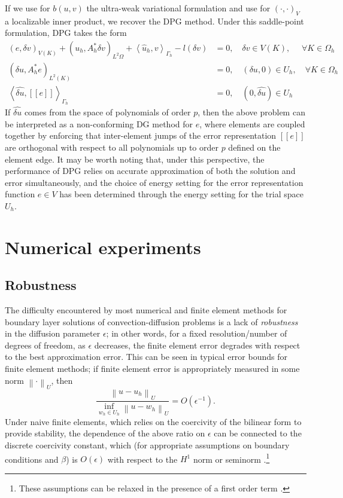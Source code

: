 \documentclass[11pt,onecolumn]{scrartcl}
\newcommand{\nor}[1]{\left\| #1 \right\|}
\newcommand{\LRp}[1]{\left( #1 \right)}
\newcommand{\LRs}[1]{\left[ #1 \right]}
\newcommand{\LRa}[1]{\left\langle #1 \right\rangle}
\newcommand{\jump}[1] {\ensuremath{\LRs{\!\left[#1\right]\!}}}
\newcommand{\uh}{\widehat{u}}
\newcommand{\Gh}{\Gamma_h}
\newcommand{\Oh}{\Omega_h}
\begin{document}
If we use for $b(u,v)$ the ultra-weak variational formulation and use for $\LRp{\cdot,\cdot}_V$ a localizable inner product, we recover the DPG method.  Under this saddle-point formulation, DPG takes the form
\begin{align*}
\LRp{e,\delta v}_{V(K)} + \LRp{u_h,A^*_h\delta v}_{L^2{\Omega}} + \LRa{\uh_h,v}_{\Gh}- l(\delta v) &= 0, \quad \delta v \in V(K),\,\, \quad \forall K\in \Oh\\
\LRp{\delta u, A_h^*e}_{L^2(K)} &= 0, \quad \LRp{\delta u,0} \in U_h, \quad \forall K\in \Oh\\
\LRa{\widehat{\delta u}, \jump{e}}_{\Gh} &= 0, \quad \LRp{0,\widehat{\delta u}} \in U_h
\end{align*}
If $\widehat{\delta u}$ comes from the space of polynomials of order $p$, then the above problem can be interpreted as a non-conforming DG method for $e$, where elements are coupled together by enforcing that inter-element jumps of the error representation $\jump{e}$ are orthogonal with respect to all polynomials up to order $p$ defined on the element edge.  It may be worth noting that, under this perspective, the performance of DPG relies on accurate approximation of both the solution and error simultaneously, and the choice of energy setting for the error representation function $e \in V$ has been determined through the energy setting for the trial space $U_h$.  

\section{Numerical experiments}

\subsection{Robustness}
The difficulty encountered by most numerical and finite element methods for boundary layer solutions of convection-diffusion problems is a lack of \textit{robustness} in the diffusion parameter $\epsilon$; in other words, for a fixed resolution/number of degrees of freedom, as $\epsilon$ decreases, the finite element error degrades with respect to the best approximation error.  This can be seen in typical error bounds for finite element methods; if finite element error is appropriately measured in some norm $\nor{\cdot}_U$, then
\[
\frac{\nor{u-u_h}_U}{\inf_{w_h\in U_h}\nor{u-w_h}_U} = O(\epsilon^{-1}).
\]
Under naive finite elements, which relies on the coercivity of the bilinear form to provide stability, the dependence of the above ratio on $\epsilon$ can be connected to the discrete coercivity constant, which (for appropriate assumptions on boundary conditions and $\beta$) is $O(\epsilon)$ with respect to the $H^1$ norm or seminorm \cite{roos2008robust}.\footnote{These assumptions can be relaxed in the presence of a first order term \cite{stynesSUPG}.}
\end{document}
